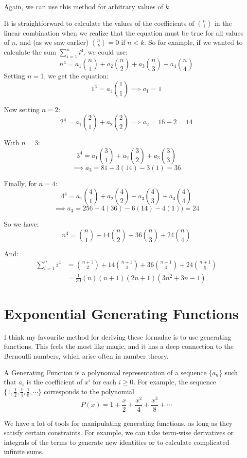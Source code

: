 \documentclass{article}
\begin{document}
Again, we can use this method for arbitrary values of $k$.

It is straightforward to calculate the values of the coefficients of $\binom{n}{i}$ in
the linear combination when we realize that the equation must be true for all values of
$n$, and (as we saw earlier) $\binom{n}{k} = 0$ if $n<k$. So for example, if we wanted to 
calculate the sum $\sum_{i=1}^{n} i^4$, we could use:
\[ n^4 = a_1\binom{n}{1} + a_2\binom{n}{2} + a_3 \binom{n}{3} + a_4 \binom{n}{4} \]
Setting $n=1$, we get the equation:
\[ 1^4 = a_1\binom{1}{1} \implies a_1 = 1 \]

Now setting $n=2$:
\[ 2^4 = a_1\binom{2}{1} + a_2\binom{2}{2} \implies a_2 = 16-2 = 14 \]

With $n=3$:
\[ 3^4 = a_1\binom{3}{1} + a_2\binom{3}{2} + a_3\binom{3}{3}\]
\[\implies a_3 = 81 -3(14) - 3(1)  = 36 \]

Finally, for $n=4$:
\[ 4^4 = a_1\binom{4}{1} + a_2\binom{4}{2} + a_3\binom{4}{3} + a_4\binom{4}{4}\]
\[\implies a_3 = 256 -4(36) - 6(14) - 4(1))  = 24\]

So we have:
\[ n^4 = \binom{n}{1} + 14\binom{n}{2} + 36 \binom{n}{3} + 24 \binom{n}{4} \]

And:
\begin{align*}
	\sum_{i=1}^{n} i^4 &= \binom{n+1}{2} + 14\binom{n+1}{3} + 36 \binom{n+1}{4}
	                      + 24 \binom{n+1}{5} \\
			   &= \frac{1}{30} (n)(n + 1)(2n + 1)(3n^2 +3n - 1)
\end{align*}

\section{Exponential Generating Functions}

I think my favourite method for deriving these formulae is to use generating functions.
This feels the most like magic, and it has a deep connection to the Bernoulli numbers,
which arise often in number theory.

A Generating Function is a polynomial representation of a sequence $\{a_n\}$ such that
$a_i$ is the coefficient of $x^i$ for each $i \geq 0$. For example, the sequence 
$\{1, \frac{1}{2}, \frac{1}{4}, \frac{1}{8}, \cdots \}$ corresponds to the polynomial
\[ P(x) = 1 + \frac{x}{2} + \frac{x^2}{4} + \frac{x^3}{8} + \cdots \]

We have a lot of tools for manipulating generating functions, as long as they satisfy
certain constraints. For example, we can take term-wise derivatives or integrals of
the terms to generate new identities or to calculate complicated infinite sums.
\end{document}
